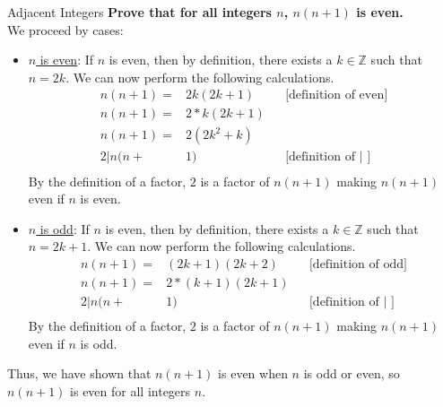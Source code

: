 \documentclass[11pt, nopagenumbers]{adamblan-hw}
\begin{document}
    \begin{question}{\color{red} Adjacent Integers}
        \textbf{Prove that for all integers $n$, $n(n + 1)$ is even.} \\
        
        We proceed by cases:
        \begin{itemize}
            \item \underline{$n$ is even}: If $n$ is even, then by definition, there exists a
            $k \in \mathbb{Z}$ such that $n = 2k$. We can now perform the following calculations.
            \begin{align*}
            n(n + 1) = &2k(2k + 1) && \text{[definition of even]}\\
            n(n + 1) = &2 * k(2k + 1) \\
            n(n + 1) = &2(2k^2 + k) \\
            2 | n(n + &1) && \text{[definition of | ]}\\
            \end{align*}
            By the definition of a factor, $2$ is a factor of $n(n + 1)$ making $n(n + 1)$ even if $n$ is even.
        
            \item \underline{$n$ is odd}: If $n$ is even, then by definition, there exists a
            $k \in \mathbb{Z}$ such that $n = 2k + 1$. We can now perform the following calculations.
            \begin{align*}
                n(n + 1) = &(2k + 1)(2k + 2) && \text{[definition of odd]}\\
                n(n + 1) = &2 * (k + 1)(2k + 1) \\
                2 | n(n+&1) && \text{[definition of | ]}\\
                \end{align*}
            By the definition of a factor, $2$ is a factor of $n(n + 1)$ making $n(n + 1)$ even if $n$ is odd.
        \end{itemize}
        Thus, we have shown that $n(n + 1)$ is even when $n$ is odd or even, so
        $n(n + 1)$ is even for all integers $n$.
    \end{question}
\end{document}
